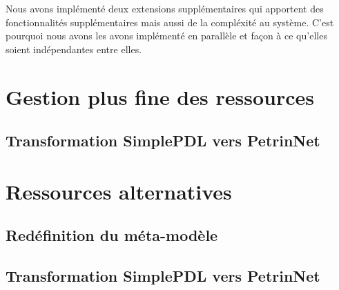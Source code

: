 Nous avons implémenté deux extensions supplémentaires qui apportent des fonctionnalités supplémentaires mais aussi de la compléxité au système. C'est pourquoi nous avons les avons implémenté en parallèle et façon à ce qu'elles soient indépendantes entre elles.

\section{Gestion plus fine des ressources}

\subsection{Transformation SimplePDL vers PetrinNet}

\section{Ressources alternatives}

\subsection{Redéfinition du méta-modèle}

\subsection{Transformation SimplePDL vers PetrinNet}
